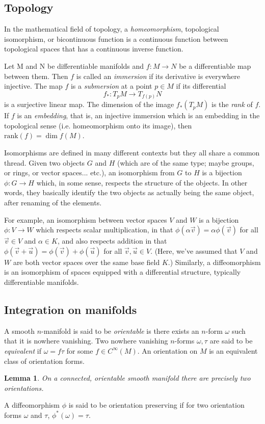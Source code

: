 \documentclass{article}
\theoremstyle{plain}
\newtheorem{lem}[teo]{Lemma}
\theoremstyle{definition}
\begin{document}
\subsection{Topology}
In the mathematical field of topology, a \textit{homeomorphism}, topological isomorphism, or bicontinuous function is a continuous function between topological spaces that has a continuous inverse function.

Let M and N be differentiable manifolds and $f: M\to N$ be a differentiable map between them. Then $f$ is called an \textit{immersion} if its derivative is everywhere injective. The map $f$ is a \textit{submersion} at a point $p\in M$ if its differential
\[
f_*:T_pM\to T_{f(p)}N
\]
is a surjective linear map. The dimension of the image $f_*(T_pM)$ is the \textit{rank} of $f$. If $f$ is an \textit{embedding}, that is, an injective immersion which is an embedding in the topological sense (i.e. homeomorphism onto its image), then $\mathrm{rank}(f)=\dim f(M)$.

Isomorphisms are defined in many different contexts but they all share a common thread. Given two objects $G$ and $H$ (which are of the same type; maybe groups, or rings, or vector spaces... etc.), an isomorphism from $G$ to $H$ is a bijection $\phi:G\to H$ which, in some sense, respects the structure of the objects. In other words, they basically identify the two objects as actually being the same object, after renaming of the elements.

For example, an isomorphism between vector spaces $V$ and $W$ is a bijection $\phi:V\to W$ which respects scalar multiplication, in that $\phi(\alpha\vec{v})=\alpha\phi(\vec{v})$ for all $\vec{v}\in V$ and $\alpha\in K$, and also respects addition in that $\phi(\vec{v}+\vec{u})=\phi(\vec{v})+\phi(\vec{u})$ for all $\vec{v},\vec{u}\in V$. (Here, we've assumed that $V$ and $W$ are both vector spaces over the same base field $K$.) Similarly, a diffeomorphism is an isomorphism of spaces equipped with a differential structure, typically differentiable manifolds.

\subsection{Integration on manifolds}
A smooth $n$-manifold is said to be \textit{orientable} is there exists an $n$-form $\omega$ such that it is nowhere vanishing. Two nowhere vanishing $n$-forms $\omega,\tau$ are said to be \textit{equivalent} if $\omega=f\tau$ for some $f\in C^\infty(M)$. An orientation on $M$ is an equivalent class of orientation forms.
\begin{lem}
On a connected, orientable smooth manifold there are precisely two orientations.
\end{lem}
A diffeomorphism $\phi$ is said to be orientation preserving if for two orientation forms $\omega$ and $\tau$, $\phi^*(\omega)=\tau$. 
\end{document}
